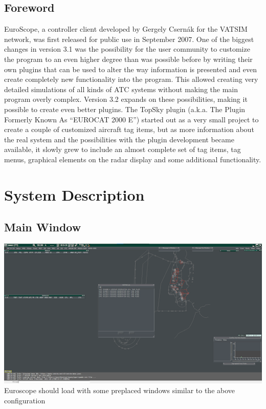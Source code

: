 \documentclass[11pt,a4paper,oldfontcommands]{memoir}
\begin{document}
\section{Foreword}
EuroScope, a controller client developed by Gergely Csernák for the VATSIM network, was first released for public use in September 2007. One of the biggest changes in version 3.1 was the possibility for the user community to customize the program to an even higher degree than was possible before by writing their own plugins that can be used to alter the way information is presented and even create completely new functionality into the program. This allowed creating very detailed simulations of all kinds of ATC systems without making the main program overly complex. Version 3.2 expands on these possibilities, making it possible to create even better plugins.
The TopSky plugin (a.k.a. The Plugin Formerly Known As “EUROCAT 2000 E”) started out as a very small project to create a couple of customized aircraft tag items, but as more information about the real system and the possibilities with the plugin development became available, it slowly grew to include an almost complete set of tag items, tag menus, graphical elements on the radar display and some additional functionality.

\chapter{System Description}
\section{Main Window}
\includegraphics[width=15cm, keepaspectratio]{img/mainwindow.png}\\
Euroscope should load with some preplaced windows similar to the above configuration\\
\end{document}
